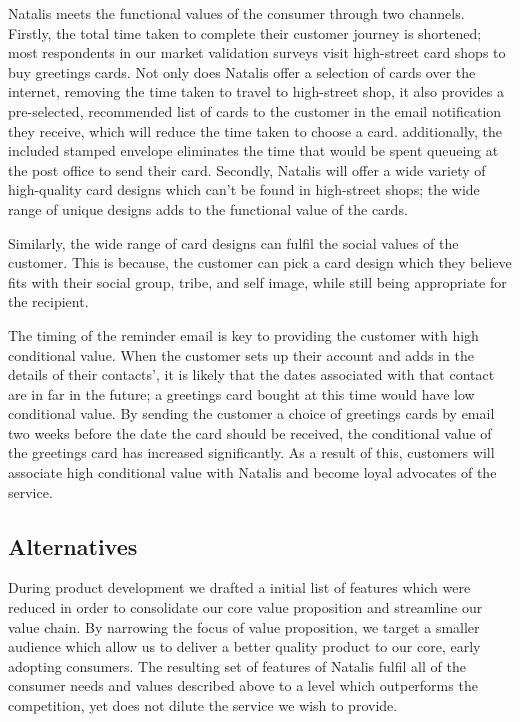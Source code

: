 \documentclass[10pt,a4paper]{article}
\begin{document}
Natalis meets the functional values of the consumer through two channels. Firstly, the total time taken to complete their customer journey is shortened; most respondents in our market validation surveys visit high-street card shops to buy greetings cards. Not only does Natalis offer a selection of cards over the internet, removing the time taken to travel to high-street shop, it also provides a pre-selected, recommended list of cards to the customer in the email notification they receive, which will reduce the time taken to choose a card. additionally, the included stamped envelope eliminates the time that would be spent queueing at the post office to send their card. Secondly, Natalis will offer a wide variety of high-quality card designs which can't be found in high-street shops; the wide range of unique designs adds to the functional value of the cards.

Similarly, the wide range of card designs can fulfil the social values of the customer. This is because, the customer can pick a card design which they believe fits with their social group, tribe, and self image, while still being appropriate for the recipient.

The timing of the reminder email is key to providing the customer with high conditional value. When the customer sets up their account and adds in the details of their contacts', it is likely that the dates associated with that contact are in far in the future; a greetings card bought at this time would have low conditional value. By sending the customer a choice of greetings cards by email two weeks before the date the card should be received, the conditional value of the greetings card has increased significantly. As a result of this, customers will associate high conditional value with Natalis and become loyal advocates of the service.


\subsection*{Alternatives}
During product development we drafted a initial list of features which were reduced in order to consolidate our core value proposition and streamline our value chain. By narrowing the focus of value proposition, we target a smaller audience which allow us to deliver a better quality product to our core, early adopting consumers. The resulting set of features of Natalis fulfil all of the consumer needs and values described above to a level which outperforms the competition, yet does not dilute the service we wish to provide.
\end{document}

